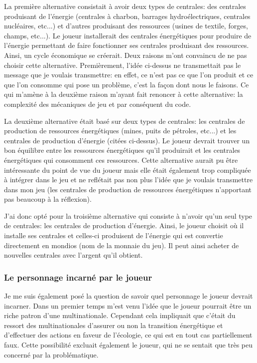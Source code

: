 \documentclass{article}
\begin{document}
        
        La première alternative consistait à avoir deux types de centrales: des centrales produisant de l'énergie (centrales à charbon, barrages hydroélectriques, centrales nucléaires, etc...) et d'autres produisant des ressources (usines de textile, forges, champs, etc...). Le joueur installerait des centrales énergétiques pour produire de l'énergie permettant de faire fonctionner ses centrales produisant des ressources. Ainsi, un cycle économique se créerait. 
        Deux raisons m'ont convaincu de ne pas choisir cette alternative. Premièrement, l'idée ci-dessus ne transmettait pas le message que je voulais transmettre: en effet, ce n'est pas ce que l'on produit et ce que l'on consomme qui pose un problème, c'est la façon dont nous le faisons. Ce qui m'amène à la deuxième raison m'ayant fait renoncer à cette alternative: la complexité des mécaniques de jeu et par conséquent du code.
        
        
        La deuxième alternative était basé sur deux types de centrales: les centrales de production de ressources énergétiques (mines, puits de pétroles, etc...) et les centrales de production d'énergie (citées ci-dessus). Le joueur devrait trouver un bon équilibre entre les ressources énergétiques qu'il produirait et les centrales énergétiques qui consomment ces ressources.
        Cette alternative aurait pu être intéressante du point de vue du joueur mais elle était également trop compliquée à intégrer dans le jeu et ne reflétait pas non plus l'idée que je voulais transmettre dans mon jeu (les centrales de production de ressources énergétiques n'apportant pas beaucoup à la réflexion).
        
        
        J'ai donc opté pour la troisième alternative qui consiste à n'avoir qu'un seul type de centrales: les centrales de production d'énergie. Ainsi, le joueur choisit où il installe ses centrales et celles-ci produisent de l'énergie qui est convertie directement en mondios (nom de la monnaie du jeu). Il peut ainsi acheter de nouvelles centrales avec l'argent qu'il obtient.
        
        \subsubsection{Le personnage incarné par le joueur}
        Je me suis également posé la question de savoir quel personnage le joueur devrait incarner. Dans un premier temps m'est venu l'idée que le joueur pourrait être un riche patron d'une multinationale. Cependant cela impliquait que c'était du ressort des multinationales d'assurer ou non la transition énergétique et d'effectuer des actions en faveur de l'écologie, ce qui est en tout cas partiellement faux. Cette possibilité excluait également le joueur, qui ne se sentait que très peu concerné par la problématique.
        
\end{document}
